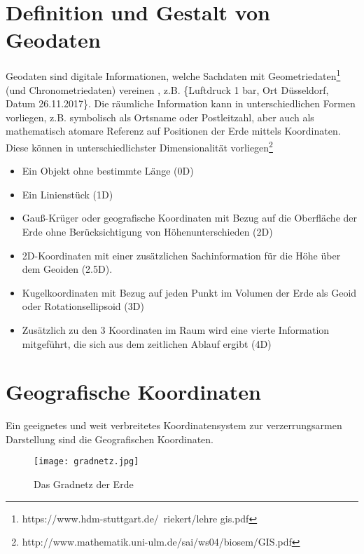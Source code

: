 \documentclass[11pt,fleqn]{book} %
\begin{document}
\section{Definition und Gestalt von Geodaten}
Geodaten sind digitale Informationen, welche Sachdaten mit Geometriedaten\footnote{https://www.hdm-stuttgart.de/~riekert/lehre gis.pdf} (und Chronometriedaten) vereinen , z.B. \{Luftdruck 1 bar, Ort Düsseldorf, Datum 26.11.2017\}. 
Die räumliche Information kann in unterschiedlichen Formen vorliegen, z.B. symbolisch als Ortsname oder Postleitzahl, aber auch als mathematisch atomare Referenz auf Positionen der Erde mittels Koordinaten. Diese können in unterschiedlichster Dimensionalität vorliegen\footnote{http://www.mathematik.uni-ulm.de/sai/ws04/biosem/GIS.pdf}
\begin{itemize}
\item Ein Objekt ohne bestimmte Länge (0D)
\item Ein Linienstück (1D)
\item
Gauß-Krüger oder geografische Koordinaten mit Bezug auf die Oberfläche der Erde ohne Berücksichtigung von Höhenunterschieden (2D)
\item 
2D-Koordinaten mit einer zusätzlichen Sachinformation für die Höhe über dem Geoiden (2.5D).
\item Kugelkoordinaten mit Bezug auf jeden Punkt im Volumen der Erde als
Geoid oder Rotationsellipsoid (3D)
\item 
Zusätzlich zu den 3 Koordinaten im Raum wird eine vierte
Information mitgeführt, die sich aus dem zeitlichen Ablauf ergibt (4D)
\end{itemize}


\newpage

\section{Geografische Koordinaten}
Ein geeignetes und weit verbreitetes Koordinatensystem zur verzerrungsarmen Darstellung sind die Geografischen Koordinaten. 

\begin{figure}[H]
\centering
\texttt{[image: gradnetz.jpg]}
\caption{Das Gradnetz der Erde}\label{gradnetz}
\end{figure}
\end{document}
